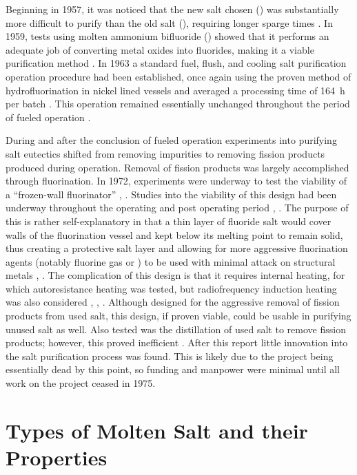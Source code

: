 Beginning in 1957, it was noticed that the new salt chosen ()
was substantially more difficult to purify than the old salt
(), requiring longer sparge times \cite{rev7,rev8}.
In 1959, tests using molten ammonium bifluoride () showed
that it performs an adequate job of converting metal oxides into
fluorides, making it a
viable purification method \cite{rev9}. In 1963 a standard fuel, flush, and
cooling salt purification operation procedure had been established,
once again using the proven method of hydrofluorination in nickel
lined vessels and averaged a processing time of \SI{164}{\hour} per batch
\cite{rev10}. This operation remained essentially unchanged throughout the
period of fueled operation \cite{rev10,rev11}. \par

During and after the conclusion of fueled operation experiments into
purifying salt eutectics shifted from removing impurities to removing
fission products produced during operation. Removal of fission
products was largely accomplished through fluorination. In 1972,
experiments were underway to test the viability of a “frozen-wall
fluorinator” \cite{rev12}, \cite{rev13}. Studies into the viability
of this design
had been underway throughout the operating and post operating period
\cite{rev12}, \cite{rev14}.  The purpose of this is rather
self-explanatory in that a
thin layer of fluoride salt would cover walls of the fluorination
vessel and kept below its melting point to remain solid, thus
creating a protective salt layer and allowing for more aggressive
fluorination agents (notably fluorine gas or ) to be used with
minimal attack on structural metals \cite{rev12}, \cite{rev13}. The
complication of
this design is that it requires internal heating, for which
autoresistance heating was tested, but radiofrequency induction
heating was also considered \cite{rev12}, \cite{rev13}, \cite{rev15}.
Although designed for
the aggressive removal of fission products from used salt, this
design, if proven viable, could be usable in purifying unused salt as
well. Also tested was the distillation of used salt to remove fission
products; however, this proved inefficient \cite{rev11}. After this report
little innovation into the salt purification process was found. This
is likely due to the project being essentially dead by this point, so
funding and manpower were minimal until all work on the project ceased in 1975.
\par

\section{Types of Molten Salt and their Properties}
\label{sec: salt properties}

